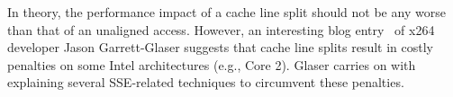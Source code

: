 In theory, the performance impact of a cache line split should not be any worse than that of an unaligned access. However, an interesting blog entry~\cite{glaser2008cachelinesplits} of x264 developer Jason Garrett-Glaser suggests that cache line splits result in costly penalties on some Intel architectures (e.g., Core 2). Glaser carries on with explaining several SSE-related techniques to circumvent these penalties.